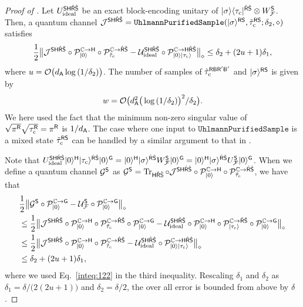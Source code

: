\begin{proof}[Proof of ]
Let $U_{\rm ideal}^{\sS\sH\hat{\sR}\hat{\sS}}$ be an exact block-encoding unitary of $\ketbra{\sigma}{\tau_{\rm c}}^{\hat{\sR}\hat{\sS}} \otimes W_\cF^\sS$.
Then, a quantum channel $\cJ^{\sS\sH\hat{\sR}\hat{\sS}} = \mathtt{UhlmannPurifiedSample}(\ket{\sigma}^{\sR\sS}, \til{\tau}_{\rm c}^{\sR\sS}; \delta_2, \diamond)$ satisfies
\begin{align}
\label{inteq:122}
    \f{1}{2}\big\|\cJ^{\sS\sH\hat{\sR}\hat{\sS}}\circ\cP_{\ket{0}}^{\bC\rarr\sH}\circ\cP_{\til{\tau}_{\rm c}}^{\bC\rarr\hat{\sR}\hat{\sS}} - \cU_{\rm ideal}^{\sS\sH\hat{\sR}\hat{\sS}} \circ \cP_{\ket{0}\ket{\tau_{\rm c}}}^{\bC\rarr\sH\hat{\sR}\hat{\sS}}\big\|_\diamond \leq \delta_2 + (2u+1)\delta_1,
\end{align}
where $u=\cO\big(d_\sA\log{(1/\delta_2)}\big)$.
The number of samples of $\til{\tau}_{\rm c}^{\sR\sB\sR'\sB'}$ and $\ket{\sigma}^{\sR\sS}$ is given by 
\begin{align}
    w =\cO\big(d_\sA^2\big(\log{(1/\delta_2)}\big)^2/\delta_2\big).
\end{align}
We here used the fact that the minimum non-zero singular value of $\sqrt{\pi^{\sR}}\sqrt{\tau_{\rm c}^{\sR}} = \pi^\sR$ is $1/d_\sA$.
The case where one input to $\mathtt{UhlmannPurifiedSample}$ is a mixed state $\til{\tau}_{\rm c}^{\sR\sS}$ can be handled by a similar argument to that in .

Note that $U_{\rm ideal}^{\sS\sH\hat{\sR}\hat{\sS}}\ket{0}^{\sH}\ket{\tau_{\rm c}}^{\hat{\sR}\hat{\sS}}\ket{0}^\sG = \ket{0}^\sH\ket{\sigma}^{\hat{\sR}\hat{\sS}}W_\cF^\sS\ket{0}^\sG = \ket{0}^\sH\ket{\sigma}^{\hat{\sR}\hat{\sS}}U_\cF^\sS\ket{0}^\sG$.
When we define a quantum channel $\cG^\sS$ as $\cG^\sS = \tr_{\sH\hat{\sR}\hat{\sS}} \circ \cJ^{\sS\sH\hat{\sR}\hat{\sS}} \circ \cP_{\ket{0}}^{\bC\rarr\sH}\circ\cP_{\til{\tau}_{\rm c}}^{\bC\rarr\hat{\sR}\hat{\sS}}$, we have that
\begin{align}
    &\f{1}{2}\big\|\cG^\sS\circ\cP_{\ket{0}}^{\bC\rarr\sG} - \cU_\cF^\sS\circ\cP_{\ket{0}}^{\bC\rarr\sG}\big\|_\diamond \notag \\
    &\leq \f{1}{2}\big\|\cJ^{\sS\sH\hat{\sR}\hat{\sS}}\circ\cP_{\ket{0}}^{\bC\rarr\sH}\circ\cP_{\til{\tau}_{\rm c}}^{\bC\rarr\hat{\sR}\hat{\sS}}\circ\cP_{\ket{0}}^{\bC\rarr\sG} - \cU_{\rm ideal}^{\sS\sH\hat{\sR}\hat{\sS}}\circ\cP_{\ket{0}}^{\bC\rarr\sH}\circ\cP_{\ket{\tau_{\rm c}}}^{\bC\rarr\hat{\sR}\hat{\sS}}\circ\cP_{\ket{0}}^{\bC\rarr\sG}\big\|_\diamond \\
    &\leq \f{1}{2}\big\|\cJ^{\sS\sH\hat{\sR}\hat{\sS}}\circ\cP_{\ket{0}}^{\bC\rarr\sH}\circ\cP_{\til{\tau}_{\rm c}}^{\bC\rarr\hat{\sR}\hat{\sS}} - \cU_{\rm ideal}^{\sS\sH\hat{\sR}\hat{\sS}} \circ \cP_{\ket{0}\ket{\tau_{\rm c}}}^{\bC\rarr\sH\hat{\sR}\hat{\sS}}\big\|_\diamond \\
    &\leq \delta_2 + (2u+1)\delta_1,
\end{align}
where we used Eq.~\eqref{inteq:122} in the third inequality.
Rescaling $\delta_1$ and $\delta_2$ as $\delta_1 = \delta/\big(2(2u+1)\big)$ and $\delta_2 = \delta/2$, the over all error is bounded from above by $\delta$.


\end{proof}
